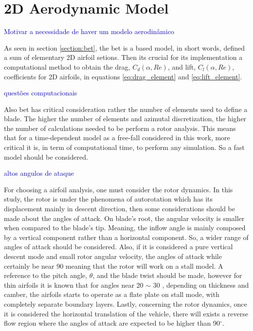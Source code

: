 
\section{2D Aerodynamic Model}
\label{section:aero_model}


\textcolor{blue}{Motivar a necessidade de haver um modelo aerodinâmico}

As seen in section \ref{section:bet}, the \gls{bet} is a based model, in short words, defined a sum of elementary 2D airfoil setions. Then its crucial for its implementation a computational method to obtain the drag, $C_d (\alpha, Re) $, and  lift, $C_l (\alpha, Re)$, coefficients for 2D airfoils, in equations \ref{eq:drag_element} and \ref{eq:lift_element}.

\textcolor{blue}{questões computacionais}

Also \gls{bet} has critical consideration rather the number of elements used to define a blade. The higher the number of elements and azimutal discretization, the higher the number of calculations needed to be perform a rotor analysis. This means that for a time-dependent model as a free-fall considered in this work, more critical it is, in term of computational time, to perform any simulation. So a fast model should be considered.


\textcolor{blue}{altos angulos de ataque}

For choosing a airfoil analysis, one must consider the rotor dynamics. In this study, the rotor is under the phenomena of autorotation which has its displacement mainly in descent direction, then some considerations should be made about the angles of attack. On blade's root, the angular velocity is smaller when compared to the blade's tip. Meaning, the inflow angle is mainly composed by a vertical component rather than a horizontal component. So, a wider range of angles of attack should be considered. Also, if it is considered a pure vertical descent mode and small rotor angular velocity, the angles of attack while certainly be near 90 \unit{\deg} meaning that the rotor will work on a stall model. A reference to the pitch angle, $\theta$, and the blade twist should be made, however for thin airfoils it is known that for angles near 20 $\sim$ 30 \unit{\deg}, depending on thickness and camber, the airfoils starts to operate as a flate plate on stall mode, with completely separate boundary layers. Lastly, concerning the rotor dynamics, once it is considered the horizontal translation of the vehicle, there will exists a reverse flow region where the angles of attack are expected to be higher than 90$^{\circ}$.


